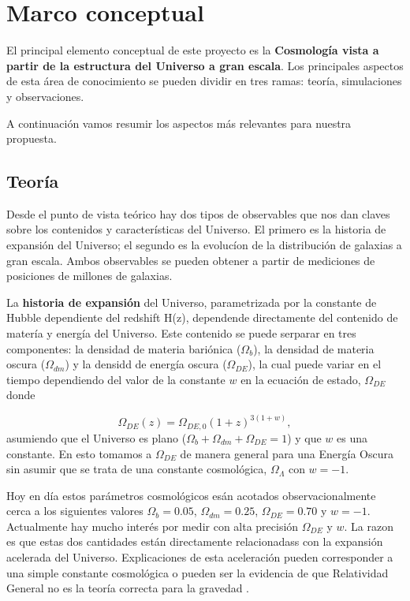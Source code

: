 
\section{Marco conceptual}


El principal elemento conceptual de este proyecto es la {\bf Cosmolog\'ia
vista a partir de la estructura del Universo a gran escala}. 
Los principales aspectos de esta área de conocimiento se pueden
dividir en tres ramas: teoría, simulaciones y observaciones.

A continuación vamos resumir los aspectos más relevantes para nuestra
propuesta. 


\subsection{Teor\'ia}

Desde el punto de vista te\'orico hay dos tipos de observables que nos
dan claves sobre los contenidos y características del Universo.
El primero es la historia de expansi\'on del Universo; el segundo es
la evolucíon de la distribución de galaxias a gran escala.
Ambos observables se pueden obtener a partir de mediciones de
posiciones de millones de galaxias.

La {\bf historia de expansi\'on} del Universo, parametrizada por la
constante de Hubble dependiente del redshift H(z), dependende
directamente del contenido de mater\'ia y energ\'ia del Universo. 
Este
contenido se puede serparar en tres componentes: la densidad de materia
bari\'onica ($\Omega_b$), la densidad de materia oscura
($\Omega_{dm}$) y la densidd de energ\'ia  oscura  ($\Omega_{DE}$), la
cual puede variar en el tiempo dependiendo del valor de la constante
$w$ en la ecuaci\'on de estado, $\Omega_{DE}$ donde 

\begin{equation}
\Omega_{DE}(z) = \Omega_{DE,0}(1+z)^{3(1+w)},
\end{equation}
%
asumiendo que el Universo es plano
($\Omega_b+\Omega_{dm}+\Omega_{DE}=1$) y que $w$ es una constante. 
En esto tomamos a $\Omega_{DE}$ de manera general para una
Energ\'ia Oscura sin asumir que se trata de una constante
cosmol\'ogica, $\Omega_\Lambda$ con $w=-1$. 

Hoy en d\'ia estos par\'ametros cosmol\'ogicos es\'an
acotados observacionalmente cerca a los siguientes valores $\Omega_b=0.05$,
$\Omega_{dm}=0.25$, $\Omega_{DE}=0.70$ y $w=-1$. 
Actualmente hay mucho interés por medir con alta precisión
$\Omega_{DE}$ y $w$.
La razon es que estas dos cantidades est\'an directamente 
relacionadass con  la expansi\'on acelerada del Universo.
Explicaciones de esta aceleración pueden corresponder a una simple
constante cosmol\'ogica o pueden ser la evidencia de que Relatividad
General no es la teor\'ia correcta para la gravedad 
\cite{2014arXiv1401.0046M}.

